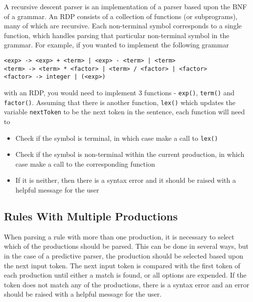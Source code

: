 A recursive descent parser is an implementation of a parser based upon the BNF of a grammar. An RDP consists of a
 collection of functions (or subprograms), many of which are recursive. Each non-terminal symbol corresponds to a
 single function, which handles parsing that particular non-terminal symbol in the grammar. For example, if you wanted
 to implement the following grammar
\begin{verbatim}
<exp> -> <exp> + <term> | <exp> - <term> | <term>
<term> -> <term> * <factor> | <term> / <factor> | <factor>
<factor> -> integer | (<exp>)
\end{verbatim}
with an RDP, you would need to implement 3 functions - \verb`exp()`, \verb`term()` and \verb`factor()`. Assuming that
 there is another function, \verb`lex()` which updates the variable \verb`nextToken` to be the next token in the
 sentence, each function will need to
\begin{itemize}
  \item Check if the symbol is terminal, in which case make a call to \verb`lex()`
  \item Check if the symbol is non-terminal within the current production, in which case make a call to the corresponding
   function
  \item If it is neither, then there is a syntax error and it should be raised with a helpful message for the user
\end{itemize}

\subsection*{Rules With Multiple Productions}

When parsing a rule with more than one production, it is necessary to select which of the productions should be parsed.
 This can be done in several ways, but in the case of a predictive parser, the production should be selected based upon
 the next input token. The next input token is compared with the first token of each production until either a match is
 found, or all options are expended. If the token does not match any of the productions, there is a syntax error and an
 error should be raised with a helpful message for the user.